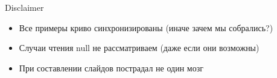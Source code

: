 %
\ifrender
\begin{frame}[fragile]{Disclaimer}%
\begin{itemize}[<+->]
\item Все примеры криво синхронизированы (иначе зачем мы собрались?)
\item Случаи чтения null не рассматриваем (даже если они возможны)
\item При составлении слайдов пострадал не один мозг
\end{itemize}
\end{frame}
\fi
